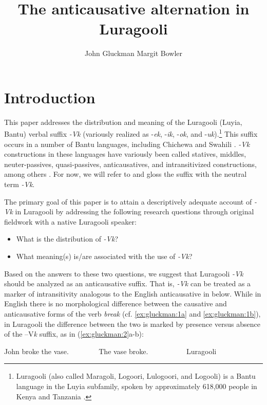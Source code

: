 \documentclass[output=paper]{langsci/lanmgscibook}
\title{The anticausative alternation in Luragooli}
\author{%
 John Gluckman\affiliation{UCLA}\lastand 
 Margit Bowler \affiliation{UCLA}
}
\begin{document}
\section{Introduction}\label{sec:gluckman:1}

This paper addresses the distribution and meaning of the Luragooli (Luyia, Bantu) verbal suffix \textit{-Vk} (variously realized as -\textit{ek}, -\textit{ik}, -\textit{ok}, and -\textit{uk}).\footnote{Luragooli (also called Maragoli, Logoori, Lulogoori, and Logooli) is a Bantu language in the Luyia subfamily, spoken by approximately 618,000 people in Kenya and Tanzania \citep{LewisEtAl2015}.} This suffix occurs in a number of Bantu languages, including Chichewa \citep{Mchombo1993,Simango2009} and Swahili \citep{SeidlDimitriadis2003}. \textit{-Vk} constructions in these languages have variously been called statives, middles, neuter-passives, quasi-passives, anticausatives, and intransitivized constructions, among others \citep{Mchombo1993,Dubinsky1996,SeidlDimitriadis2003,Fernando2013}. For now, we will refer to and gloss the suffix with the neutral term \textit{-Vk}.

The primary goal of this paper is to attain a descriptively adequate account of \textit{-Vk} in Luragooli by addressing the following research questions through original fieldwork with a native Luragooli speaker:

\begin{itemize}
\item What is the distribution of \textit{-Vk}?
\item What meaning(s) is/are associated with the use of \textit{-Vk}?
\end{itemize}

Based on the answers to these two questions, we suggest that Luragooli \textit{-Vk} should be analyzed as an anticausative suffix. That is, \textit{-Vk} can be treated as a marker of intransitivity analogous to the English anticausative in  below. While in English there is no morphological difference between the causative and anticausative forms of the verb \textit{break} (cf. \ref{ex:gluckman:1a} and \ref{ex:gluckman:1b}), in Luragooli the difference between the two is marked by presence versus absence of the –V\textit{k} suffix, as in (\ref{ex:gluckman:2}a-b):


\ea\label{ex:gluckman:1} 
\ea\label{ex:gluckman:1a} 
   John broke the vase.~ ~ ~ ~ ~       
 \ex \label{ex:gluckman:1b} 
 The vase broke. ~ ~ ~ ~ ~ ~       
 \z
\z
{}
\ea\label{ex:gluckman:2}{Luragooli}{}{}\\
\ea \label{ex:gluckman:2a}
 
\end{document}
